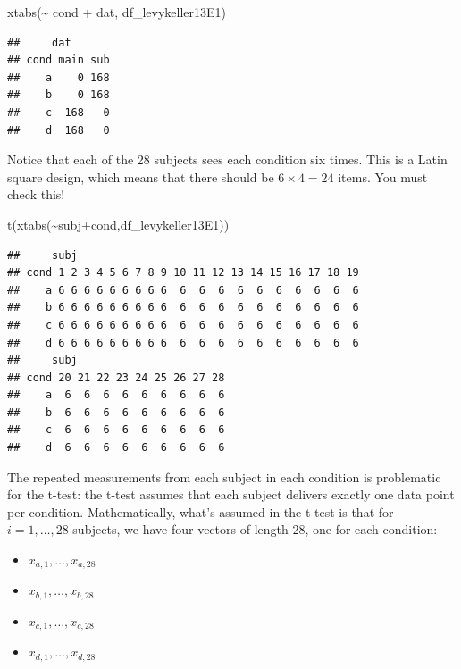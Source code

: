 \documentclass[
  12pt,
]{krantz}
\newenvironment{Shaded}{\begin{snugshade}}{\end{snugshade}}
\newcommand{\FunctionTok}[1]{\textcolor[rgb]{0.00,0.00,0.00}{#1}}
\newcommand{\NormalTok}[1]{#1}
\newcommand{\SpecialCharTok}[1]{\textcolor[rgb]{0.00,0.00,0.00}{#1}}
\providecommand{\tightlist}{%
  \setlength{\itemsep}{0pt}\setlength{\parskip}{0pt}}
\theoremstyle{definition}
\theoremstyle{definition}
\theoremstyle{definition}
\theoremstyle{definition}
\theoremstyle{remark}
\begin{document}
\begin{Shaded}
\begin{Highlighting}[]
\FunctionTok{xtabs}\NormalTok{(}\SpecialCharTok{\textasciitilde{}}\NormalTok{ cond }\SpecialCharTok{+}\NormalTok{ dat, df\_levykeller13E1)}
\end{Highlighting}
\end{Shaded}

\begin{verbatim}
##     dat
## cond main sub
##    a    0 168
##    b    0 168
##    c  168   0
##    d  168   0
\end{verbatim}

Notice that each of the 28 subjects sees each condition six times. This is a Latin square design, which means that there should be \(6\times 4=24\) items. You must check this!

\begin{Shaded}
\begin{Highlighting}[]
\FunctionTok{t}\NormalTok{(}\FunctionTok{xtabs}\NormalTok{(}\SpecialCharTok{\textasciitilde{}}\NormalTok{subj}\SpecialCharTok{+}\NormalTok{cond,df\_levykeller13E1))}
\end{Highlighting}
\end{Shaded}

\begin{verbatim}
##     subj
## cond 1 2 3 4 5 6 7 8 9 10 11 12 13 14 15 16 17 18 19
##    a 6 6 6 6 6 6 6 6 6  6  6  6  6  6  6  6  6  6  6
##    b 6 6 6 6 6 6 6 6 6  6  6  6  6  6  6  6  6  6  6
##    c 6 6 6 6 6 6 6 6 6  6  6  6  6  6  6  6  6  6  6
##    d 6 6 6 6 6 6 6 6 6  6  6  6  6  6  6  6  6  6  6
##     subj
## cond 20 21 22 23 24 25 26 27 28
##    a  6  6  6  6  6  6  6  6  6
##    b  6  6  6  6  6  6  6  6  6
##    c  6  6  6  6  6  6  6  6  6
##    d  6  6  6  6  6  6  6  6  6
\end{verbatim}

The repeated measurements from each subject in each condition is problematic for the t-test: the t-test assumes that each subject delivers exactly one data point per condition. Mathematically, what's assumed in the t-test is that for \(i=1,\dots,28\) subjects, we have four vectors of length 28, one for each condition:

\begin{itemize}
\tightlist
\item
  \(x_{a,1},\dots,x_{a,28}\)
\item
  \(x_{b,1},\dots,x_{b,28}\)
\item
  \(x_{c,1},\dots,x_{c,28}\)
\item
  \(x_{d,1},\dots,x_{d,28}\)
\end{itemize}
\end{document}
